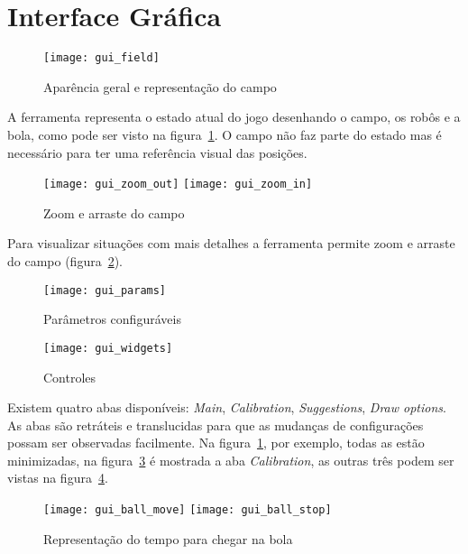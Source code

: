 \section{Interface Gráfica}\label{sec:gui}

\FloatBarrier

\begin{figure}[h]
  \centering
  \texttt{[image: gui\_field]}
  \caption{Aparência geral e representação do campo}\label{fig:gui_field}
\end{figure}

A ferramenta representa o estado atual do jogo desenhando o campo, os robôs e a
bola, como pode ser visto na figura~\ref{fig:gui_field}.  O campo não faz parte
do estado mas é necessário para ter uma referência visual das posições.

\begin{figure}[h]
  \centering
  \texttt{[image: gui\_zoom\_out]}
  \texttt{[image: gui\_zoom\_in]}
  \caption{Zoom e arraste do campo}\label{fig:gui_zoom}
\end{figure}

Para visualizar situações com mais detalhes a ferramenta permite zoom e arraste
do campo (figura~\ref{fig:gui_zoom}).

\begin{figure}[h]
  \centering
  \texttt{[image: gui\_params]}
  \caption{Parâmetros configuráveis}\label{fig:gui_params}
\end{figure}

\begin{figure}[h]
  \centering
  \texttt{[image: gui\_widgets]}
  \caption{Controles}\label{fig:gui_widgets}
\end{figure}

Existem quatro abas disponíveis: \textit{Main}, \textit{Calibration},
\textit{Suggestions}, \textit{Draw options}. As abas são retráteis e
translucidas para que as mudanças de configurações possam ser observadas
facilmente.  Na figura~\ref{fig:gui_field}, por exemplo, todas as estão
minimizadas, na figura~\ref{fig:gui_params} é mostrada a aba
\textit{Calibration}, as outras três podem ser vistas na
figura~\ref{fig:gui_widgets}.

\begin{figure}[h]
  \centering
  \texttt{[image: gui\_ball\_move]}
  \texttt{[image: gui\_ball\_stop]}
  \caption{Representação do tempo para chegar na bola}\label{fig:gui_ball}
\end{figure}

